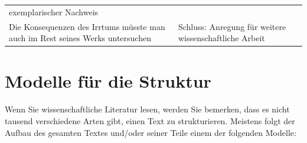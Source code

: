 \documentclass[]{book}
\theoremstyle{definition}
\theoremstyle{definition}
\theoremstyle{definition}
\theoremstyle{remark}
\begin{document}
\begin{longtable}[]{@{}ll@{}}
\begin{minipage}[t]{0.43\columnwidth}
exemplarischer Nachweis \vspace{-6mm}\strut
\end{minipage}\tabularnewline
\begin{minipage}[t]{0.51\columnwidth}\raggedright\strut
Die Konsequenzen des Irrtums müsste man auch im Rest seines Werks
untersuchen\strut
\end{minipage} & \begin{minipage}[t]{0.43\columnwidth}\raggedright\strut
Schluss: Anregung für weitere wissenschaftliche Arbeit\strut
\end{minipage}\tabularnewline
\bottomrule
\end{longtable}

\section{Modelle für die Struktur}\label{modelle-fur-die-struktur}

Wenn Sie wissenschaftliche Literatur lesen, werden Sie bemerken, dass es
nicht tausend verschiedene Arten gibt, einen Text zu strukturieren.
Meistens folgt der Aufbau des gesamten Textes und/oder seiner Teile
einem der folgenden Modelle:
\end{document}
